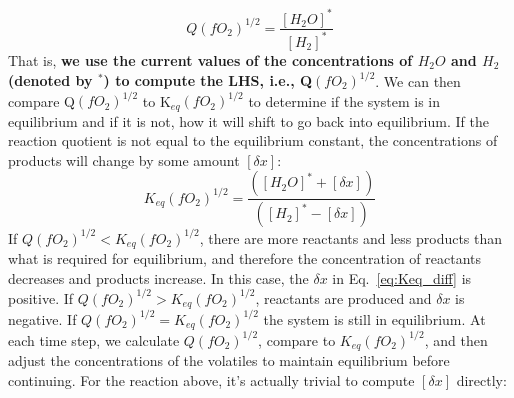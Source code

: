 \begin{equation}
Q\left(fO_2\right)^{1/2} = \frac{[H_2O]^\ast}{[H_2]^\ast }
\end{equation}
That is, \textbf{we use the current values of the concentrations of $H_2O$ and $H_2$ (denoted by $^\ast$) to compute the LHS, i.e., Q$(fO_2)^{1/2}$}.
We can then compare Q$(fO_2)^{1/2}$ to K$_{eq}(fO_2)^{1/2}$ to determine if the system is in equilibrium and if it is not, how it will shift to go back into equilibrium. If the reaction quotient is not equal to the equilibrium constant, the concentrations of products will change by some amount $[\delta x]$:
\begin{equation}
K_{eq} (fO_2)^{1/2} = \frac{([H_2O]^\ast + [\delta x])}{([H_2]^\ast - [\delta x])}
\label{eq:Keq_diff}
\end{equation}
If $Q(fO_2)^{1/2} < K_{eq}(fO_2)^{1/2}$, there are more reactants and less products than what is required for equilibrium, and therefore the concentration of reactants decreases and products increase.  In this case, the $\delta x$ in Eq.~\ref{eq:Keq_diff} is positive. If $Q(fO_2)^{1/2} > K_{eq}(fO_2)^{1/2}$, reactants are produced and $\delta x$ is negative.  If $Q(fO_2)^{1/2} = K_{eq}(fO_2)^{1/2}$ the system is still in equilibrium.  At each time step, we calculate $Q(fO_2)^{1/2}$, compare to $K_{eq}(fO_2)^{1/2}$, and then adjust the concentrations of the volatiles to maintain equilibrium before continuing.  For the reaction above, it's actually trivial to compute $[\delta x]$ directly:
